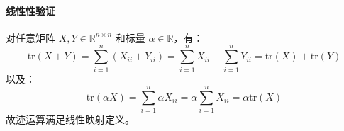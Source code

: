 \paragraph{线性性验证}  
对任意矩阵 \( X, Y \in \mathbb{R}^{n \times n} \) 和标量 \( \alpha \in \mathbb{R} \)，有：
\[
\text{tr}(X + Y) = \sum_{i=1}^n (X_{ii} + Y_{ii}) = \sum_{i=1}^n X_{ii} + \sum_{i=1}^n Y_{ii} = \text{tr}(X) + \text{tr}(Y)
\]
以及：
\[
\text{tr}(\alpha X) = \sum_{i=1}^n \alpha X_{ii} = \alpha \sum_{i=1}^n X_{ii} = \alpha \text{tr}(X)
\]
故迹运算满足线性映射定义。